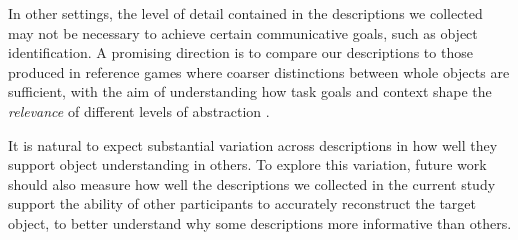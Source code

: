 In other settings, the level of detail contained in the descriptions we collected may not be necessary to achieve certain communicative goals, such as object identification. 
A promising direction is to compare our descriptions to those produced in reference games where coarser distinctions between whole objects are sufficient, with the aim of understanding how task goals and context shape the \emph{relevance} of different levels of abstraction . 

It is natural to expect substantial variation across descriptions in how well they support object understanding in others.
To explore this variation, future work should also measure how well the descriptions we collected in the current study support the ability of other participants to accurately reconstruct the target object, to better understand why some descriptions more informative than others.




